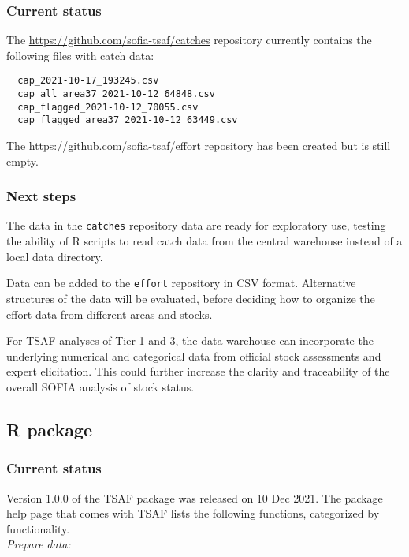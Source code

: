 \documentclass[12pt]{article}
\newcommand\blue[1]{\textcolor{darkblue}{#1}}
\begin{document}
\subsubsection{Current status}

The \blue{\url{https://github.com/sofia-tsaf/catches}} repository currently
contains the following files with catch data:

\begin{verbatim}
  cap_2021-10-17_193245.csv
  cap_all_area37_2021-10-12_64848.csv
  cap_flagged_2021-10-12_70055.csv
  cap_flagged_area37_2021-10-12_63449.csv
\end{verbatim}

The \blue{\url{https://github.com/sofia-tsaf/effort}} repository has been
created but is still empty.

\subsubsection{Next steps}

The data in the \verb|catches| repository data are ready for exploratory use,
testing the ability of R scripts to read catch data from the central warehouse
instead of a local data directory.

Data can be added to the \verb|effort| repository in CSV format. Alternative
structures of the data will be evaluated, before deciding how to organize the
effort data from different areas and stocks.

For TSAF analyses of Tier 1 and 3, the data warehouse can incorporate the
underlying numerical and categorical data from official stock assessments and
expert elicitation. This could further increase the clarity and traceability of
the overall SOFIA analysis of stock status.

\subsection{R package}

\subsubsection{Current status}

Version 1.0.0 of the {\sf TSAF} package was released on 10 Dec 2021. The package
help page that comes with {\sf TSAF} lists the following functions, categorized
by functionality.\\[-2ex]

{\it Prepare data:}
\end{document}

